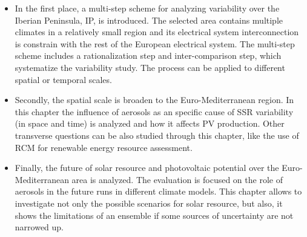 \begin{itemize}
\item In the first place, a multi-step scheme for analyzing variability over the Iberian Peninsula, IP, is introduced. The selected area contains multiple climates in a relatively small region and its electrical system interconnection is constrain with the rest of the European electrical system. The multi-step scheme includes a rationalization step and inter-comparison step, which systematize the variability study. The process can be applied to different spatial or temporal scales.

\item Secondly, the spatial scale is broaden to the Euro-Mediterranean region. In this chapter the influence of aerosols as an specific cause of SSR variability (in space and time) is analyzed and how it affects PV production. Other transverse questions can be also studied through this chapter, like the use of RCM for renewable energy resource assessment.

\item Finally, the future of solar resource and photovoltaic potential over the Euro-Mediterranean area is analyzed. The evaluation is focused on the role of aerosols in the future runs in different climate models. This chapter allows to investigate not only the possible scenarios for solar resource, but also, it shows the limitations of an ensemble if some sources of uncertainty are not narrowed up.

\end{itemize}  





% 